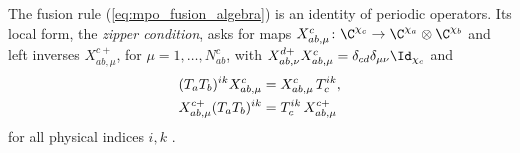 \begin{remark}%
    \label{rem:mposym_zipper}
    The fusion rule (\ref{eq:mpo_fusion_algebra}) is an identity of periodic
    operators. Its local form, the \emph{zipper condition}, asks for maps
    $X_{ab,\mu}^c\colon\C^{\chi_c}\to\C^{\chi_a}\otimes\C^{\chi_b}$ and left
    inverses $X_{ab,\mu}^{c+}$, for $\mu=1,\ldots,N_{ab}^c$, with
    $X_{ab,\nu}^{d+}X_{ab,\mu}^c=\delta_{cd}\delta_{\mu\nu}\Id_{\chi_c}$ and
    \begin{align}
        (T_aT_b)^{ik}X_{ab,\mu}^c    & =X_{ab,\mu}^c\,T_c^{ik},
        \notag                                                    \\
        X_{ab,\mu}^{c+}(T_aT_b)^{ik} & =T_c^{ik}\,X_{ab,\mu}^{c+}
        \label{eq:mposym_zipper}
    \end{align}
    for all physical indices $i,k$ \cite{Bultinck2017Anyons}.


\end{remark}
